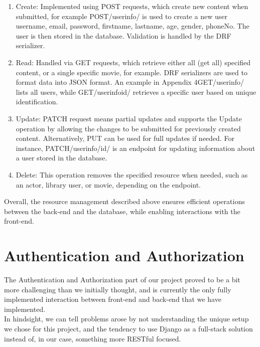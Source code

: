 \documentclass[letterpaper,twocolumn]{article}
\begin{document}
\begin{enumerate}
    \item Create: Implemented using POST requests, which create new content when submitted, for example POST/userinfo/ is used to create a new user {username, email, password, firstname, lastname, age, gender, phoneNo}. The user is then stored in the database. Validation is handled by the DRF serializer. 

    \item Read: Handled via GET requests, which retrieve either all (get all) specified content, or a single specific movie, for example. DRF serializers are used to format data into JSON format. An example in Appendix 4GET/userinfo/ lists all users, while GET/userinfo{id}/ retrieves a specific user based on unique identification.

    \item Update: PATCH request means partial updates and supports the Update operation by allowing the changes to be submitted for previously created content. Alternatively, PUT can be used for full updates if needed. For instance, PATCH/userinfo/{id}/ is an endpoint for updating information about a user stored in the database. 

    \item Delete: This operation removes the specified resource when needed, such as an actor, library user, or movie, depending on the endpoint. 

\end{enumerate}

Overall, the resource management described above ensures efficient operations between the back-end and the database, while enabling interactions with the front-end. 

\section{Authentication and Authorization}

The Authentication and Authorization part of our project proved to be a bit more challenging than we initially thought, and is currently the only fully implemented interaction between front-end and back-end that we have implemented. \\

In hindsight, we can tell problems arose by not understanding the unique setup we chose for this project, and the tendency to use Django as a full-stack solution instead of, in our case, something more RESTful focused. \\
\end{document}
